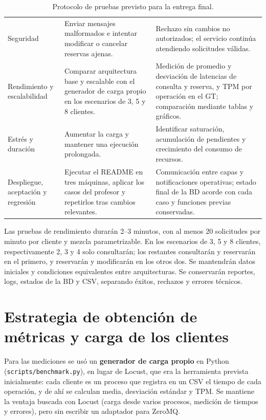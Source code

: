 \documentclass[10pt, a4paper]{article}
\begin{document}
\begin{table}[H]
\begin{tabular}{@{}p{}p{}p{}@{}}
            Seguridad & Enviar mensajes malformados e intentar modificar o cancelar reservas ajenas. & Rechazo sin cambios no autorizados; el servicio continúa atendiendo solicitudes válidas. \\
            Rendimiento y escalabilidad & Comparar arquitectura base y escalable con el generador de carga propio en los escenarios de 3, 5 y 8 clientes. & Medición de promedio y desviación de latencias de consulta y reserva, y TPM por operación en el GT; comparación mediante tablas y gráficos. \\
            Estrés y duración & Aumentar la carga y mantener una ejecución prolongada. & Identificar saturación, acumulación de pendientes y crecimiento del consumo de recursos. \\
            Despliegue, aceptación y regresión & Ejecutar el README en tres máquinas, aplicar los casos del profesor y repetirlos tras cambios relevantes. & Comunicación entre capas y notificaciones operativas; estado final de la BD acorde con cada caso y funciones previas conservadas. \\
            \bottomrule
        \end{tabular}
        \caption{Protocolo de pruebas previsto para la entrega final.}
        \label{tab:protocol}
    \end{table}

    Las pruebas de rendimiento durarán 2--3 minutos, con al menos 20 solicitudes por minuto por cliente y mezcla parametrizable. En los escenarios de 3, 5 y 8 clientes, respectivamente 2, 3 y 4 solo consultarán; los restantes consultarán y reservarán en el primero, y reservarán y modificarán en los otros dos. Se mantendrán datos iniciales y condiciones equivalentes entre arquitecturas. Se conservarán reportes, logs, estados de la BD y CSV, separando éxitos, rechazos y errores técnicos.
	
	\section{Estrategia de obtención de métricas y carga de los clientes}
	\label{sec:testing}
	Para las mediciones se usó un \textbf{generador de carga propio} en Python (\texttt{scripts/benchmark.py}), en lugar de Locust, que era la herramienta prevista inicialmente: cada cliente es un proceso que registra en un CSV el tiempo de cada operación, y de ahí se calculan media, desviación estándar y TPM. Se mantiene la ventaja buscada con Locust (carga desde varios procesos, medición de tiempos y errores), pero sin escribir un adaptador para ZeroMQ.
	
\end{document}
